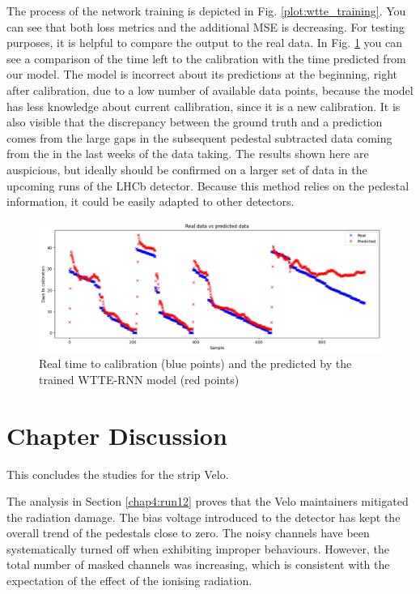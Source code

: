 The process of the network training is depicted in Fig. \ref{plot:wtte_training}.
You can see that both loss metrics and the additional MSE is decreasing.
For testing purposes, it is helpful to compare the output to the real data.
In Fig. \ref{plot:wtte_realpred} you can see a comparison of the time left to the calibration with the time predicted from our model.
The model is incorrect about its predictions at the beginning, right after calibration, due to a low number of available data points, because the model has less knowledge about current callibration, since it is a new calibration.
It is also visible that the discrepancy between the ground truth and a prediction comes from the large gaps in the subsequent pedestal subtracted data coming from the  in the last weeks of the data taking.
The results shown here are auspicious, but ideally should be confirmed on a larger set of data in the upcoming runs of the LHCb detector.
Because this method relies on the pedestal information, it could be easily adapted to other detectors.

\begin{figure}
    \centering
    \includegraphics[width=\linewidth]{figures/chapter4/wtte/real_vs_predicted.png}
    \caption{Real time to calibration (blue points) and the predicted by the trained WTTE-RNN model (red points)}
    \label{plot:wtte_realpred}
  \end{figure}

\section{Chapter Discussion}

This concludes the studies for the strip Velo. 

The analysis in Section \ref{chap4:run12} proves that the Velo maintainers mitigated the radiation damage. The bias voltage introduced to the detector has kept the overall trend of the pedestals close to zero. The noisy channels have been systematically turned off when exhibiting improper behaviours. However, the total number of masked channels was increasing, which is consistent with the expectation of the effect of the ionising radiation.

